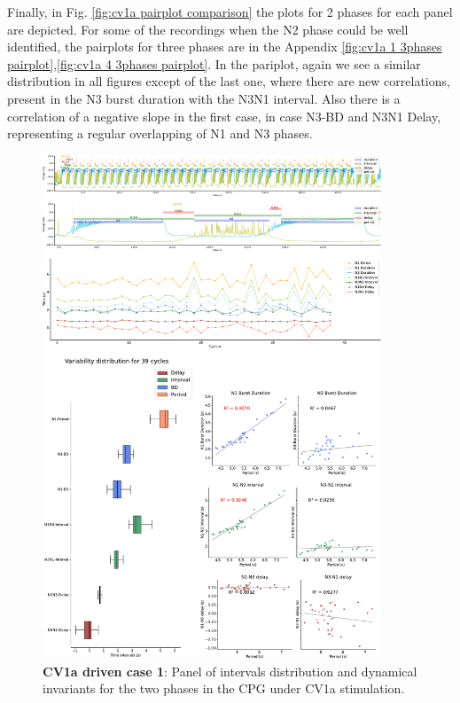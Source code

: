 Finally, in Fig. \ref{fig:cv1a pairplot comparison} the plots for 2 phases for each panel are depicted. For some of the recordings when the N2 phase could be well identified, the pairplots for three phases are in the Appendix \ref{fig:cv1a 1 3phases pairplot},\ref{fig:cv1a 4 3phases pairplot}. In the pariplot, again we see a similar distribution in all figures except of the last one, where there are new correlations, present in the N3 burst duration with the N3N1 interval. Also there is a correlation of a negative slope in the first case, in case N3-BD and N3N1 Delay, representing a regular overlapping of N1 and N3 phases. 
%

\begin{figure}[htbp]
	\centering
	\includegraphics[width=0.9\textwidth]{./img/invariants/data/SUSSEX/CV1a_driven1/images/2phases/panel_with_intervals.pdf}
	\caption{\textbf{CV1a driven case 1}: Panel of intervals distribution and dynamical invariants for the two phases in the CPG under CV1a stimulation.}
	\label{fig:cv1a 1 2phases}
\end{figure}


